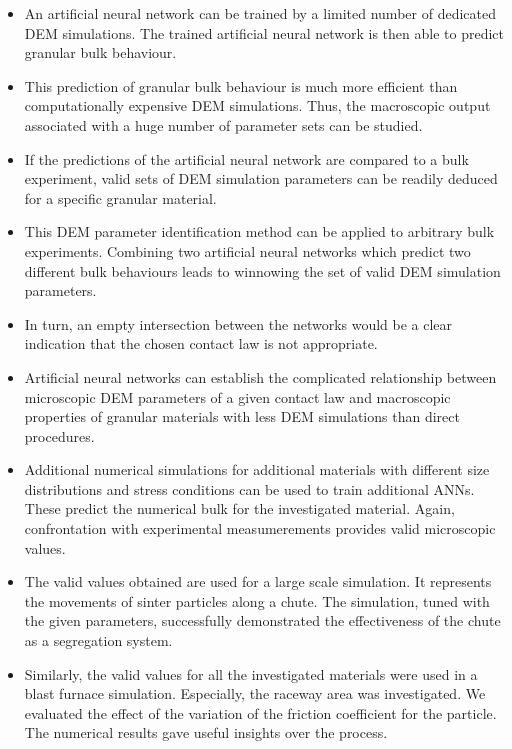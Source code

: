 \begin{itemize}
  \item{An artificial neural network can be trained by a limited number of
  dedicated \acs{DEM} simulations.
  The trained artificial neural network is then able to predict
  granular bulk behaviour.}
  \item{This prediction of granular bulk behaviour is much more efficient
  than computationally expensive \acs{DEM} simulations.
  Thus, the macroscopic output associated with a huge number of parameter sets
  can be studied.}
  \item{If the predictions of the artificial neural network are compared to a bulk experiment,
  valid sets of \acs{DEM} simulation parameters can be readily deduced for a
  specific granular material.}
  \item{This \acs{DEM} parameter identification method can be applied to
  arbitrary bulk experiments.
  Combining two artificial neural networks which predict two different bulk
  behaviours leads to winnowing the set of valid \acs{DEM} simulation parameters.}
  \item{In turn, an empty intersection between the networks would be a clear
  indication that the chosen contact law is not appropriate.}
  \item{Artificial neural networks can establish the complicated relationship
  between microscopic \acs{DEM} parameters of a given contact law and macroscopic
  properties of granular materials with less \acs{DEM} simulations than direct
  procedures.}
  \item{Additional numerical simulations for additional materials with different
  size distributions and stress conditions can be used to train additional \acs{ANNs}. 
  These predict the numerical bulk for the investigated material. Again,
  confrontation with experimental measumerements provides valid microscopic
  values.}
  \item{The valid values obtained are used for a large scale simulation. It
  represents the movements of sinter particles along a chute. The simulation,
  tuned with the given parameters, successfully demonstrated the effectiveness
  of the chute as a segregation system.}
  \item{Similarly, the valid values for all the investigated materials were
  used in a blast furnace simulation. Especially, the raceway area was
  investigated. We evaluated the effect of the variation of the friction
  coefficient for the particle.
  The numerical results gave useful insights over the process.}
\end{itemize}
